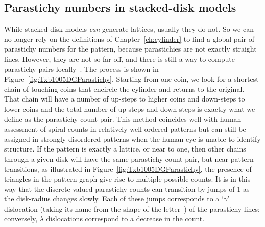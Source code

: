 \subsection{Parastichy numbers in stacked-disk models}
While stacked-disk models \textit{can} generate lattices, usually they do not. 
So we can no longer rely on the  definitions of Chapter~\ref{ch:cylinder}
to find a global pair of parastichy numbers for the pattern, because  parastichies are not exactly straight lines.  However, they are not so far off, and there is still a way to compute parastichy pairs locally~\autocite{goleFibonacciQuasisymmetricPhyllotaxis2016}.
The process is shown in Figure~\ref{fig:Txb1005DGParastichy}. Starting from one coin, we look for a shortest chain of touching coins that encircle the cylinder and returns to the original. That chain will have a number of up-steps to higher coins and down-steps to lower coins and the total number of up-steps and down-steps is exactly what we define as the parastichy count pair. 
%
This method coincides well with human assessment of spiral counts in relatively well ordered patterns but can still be assigned in strongly disordered patterns when the human eye is unable to identify structure. 
%	 
	 If the pattern is exactly a lattice, or near to one,
	 then other chains  through a given disk will have the same parastichy count pair, but near pattern transitions, as illustrated in Figure~\ref{fig:Txb1005DGParastichy}, the presence of triangles in the pattern graph give rise to  multiple possible  counts. It is in this way that the discrete-valued parastichy counts can transition by jumps of 1 as the disk-radius changes slowly. 
	 Each of these jumps corresponds to a `$\gamma$' dislocation (taking its name from the shape of the letter~\cite{zagorska-marekPhyllotacticPatternsTransitions1985}) of the parastichy lines; conversely, $\lambda$ dislocations correspond to a decrease in the count.


